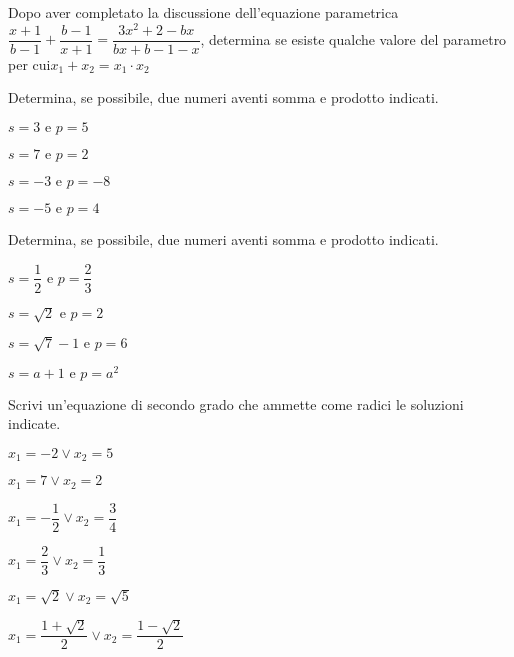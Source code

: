 \begin{esercizio}[\Ast]
 \label{ese:3.76}
Dopo aver completato la discussione dell'equazione parametrica\(\dfrac{x + 
1}{b-1} + \dfrac{b-1}{x + 1}=\dfrac{3 x^{2} + 2-b x}{b x + b-1-x}\), 
determina se 
esiste qualche valore del parametro per cui\(x_{1} + x_{2} = x_{1} \cdot 
x_{2}\)
\end{esercizio}

\begin{esercizio}
 \label{ese:3.77}
Determina, se possibile, due numeri aventi somma e prodotto indicati.
\begin{multicols}{2}
\begin{enumeratea}
\item\(s = 3 \text{ e } p = 5\)
\item\(s = 7 \text{ e } p = 2\)
\item\(s =-3 \text{ e } p =-8\)
\item\(s =-5 \text{ e } p = 4\)
\end{enumeratea}
\end{multicols}
\end{esercizio}

\begin{esercizio}
 \label{ese:3.78}
Determina, se possibile, due numeri aventi somma e prodotto indicati.
\begin{multicols}{2}
\begin{enumeratea}
\item\(s = \dfrac{1}{2} \text{ e } p = \dfrac{2}{3}\)
\item\(s = \sqrt{2} \text{ e } p = 2\)
\item\(s = \sqrt{7}-1 \text{ e } p = 6\)
\item\(s = a + 1 \text{ e } p= a^{2}\)
\end{enumeratea}
\end{multicols}
\end{esercizio}

\begin{esercizio}
 \label{ese:3.79}
Scrivi un'equazione di secondo grado che ammette come radici le soluzioni 
indicate.
\begin{multicols}{2}
\begin{enumeratea}
\item\(x_{1} =-2 \vee x_{2} = 5\)
\item\(x_{1} = 7 \vee x_{2} = 2\)
\item\(x_{1} =-\dfrac{1}{2} \vee x_{2} = \dfrac{3}{4}\)
\item\(x_{1} = \dfrac{2}{3} \vee x_{2} = \dfrac{1}{3}\)
\item\(x_{1} = \sqrt{2} \vee x_{2} = \sqrt{5}\)
\item\(x_{1} = \dfrac{1 + \sqrt{2}}{2} \vee x_{2} = \dfrac{1-\sqrt{2}}{2}\)
\end{enumeratea}
\end{multicols}
\end{esercizio}

